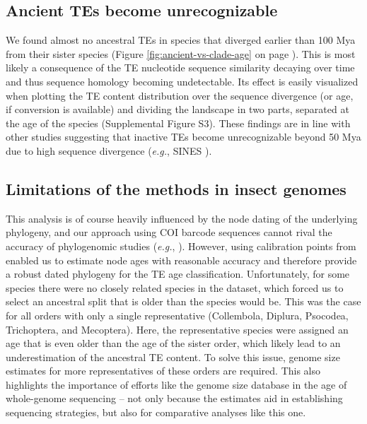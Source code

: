 \subsection{Ancient TEs become
unrecognizable}\label{ancient-tes-become-unrecognizable}

We found almost no ancestral TEs in species that diverged earlier than
100 Mya from their sister species (Figure \ref{fig:ancient-vs-clade-age} on page
\pageref{fig:ancient-vs-clade-age}). This is most likely a
consequence of the TE nucleotide sequence similarity decaying over time
and thus sequence homology becoming undetectable. Its effect is easily
visualized when plotting the TE content distribution over the sequence
divergence (or age, if conversion is available) and dividing the
landscape in two parts, separated at the age of the species
(Supplemental Figure S3). These findings are in line with other studies
suggesting that inactive TEs become unrecognizable beyond 50 Mya due to
high sequence divergence (\emph{e.g.}, SINES \citep{Shedlock2000}).

\subsection{Limitations of the methods in insect
genomes}\label{limitations-of-the-methods-in-insect-genomes}

This analysis is of course heavily influenced by the node dating of the
underlying phylogeny, and our approach using COI barcode sequences
cannot rival the accuracy of phylogenomic studies (\emph{e.g.},
\citep{Misof2014}). However, using calibration points from
\citep{Misof2014} enabled us to estimate node ages with reasonable
accuracy and therefore provide a robust dated phylogeny for the TE age
classification. Unfortunately, for some species there were no closely
related species in the dataset, which forced us to select an ancestral
split that is older than the species would be. This was the case for all
orders with only a single representative (Collembola, Diplura, Psocodea,
Trichoptera, and Mecoptera). Here, the representative species were
assigned an age that is even older than the age of the sister order,
which likely lead to an underestimation of the ancestral TE content. To
solve this issue, genome size estimates for more representatives of
these orders are required. This also highlights the importance of
efforts like the genome size database \citep{Gregory2018} in the age of
whole-genome sequencing -- not only because the estimates aid in
establishing sequencing strategies, but also for comparative analyses
like this one.

